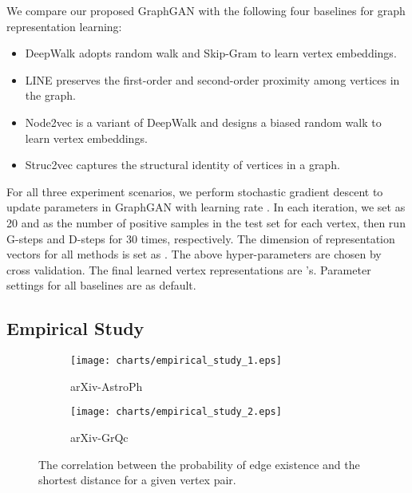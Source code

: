 \documentclass[letterpaper]{article}
\begin{document}
		We compare our proposed GraphGAN with the following four baselines for graph representation learning:
		\begin{itemize}
			\setlength\itemsep{0.0em}
			\item
				DeepWalk \cite{perozzi2014deepwalk} adopts random walk and Skip-Gram to learn vertex embeddings.
			\item
				LINE \cite{tang2015line} preserves the first-order and second-order proximity among vertices in the graph.
			\item
				Node2vec \cite{grover2016node2vec} is a variant of DeepWalk and designs a biased random walk to learn vertex embeddings.
			\item
				Struc2vec \cite{ribeiro2017struc2vec} captures the structural identity of vertices in a graph.
		\end{itemize}
		
		For all three experiment scenarios, we perform stochastic gradient descent to update parameters in GraphGAN with learning rate .
		In each iteration, we set  as 20 and  as the number of positive samples in the test set for each vertex, then run G-steps and D-steps for 30 times, respectively.
		The dimension of representation vectors  for all methods is set as .
		The above hyper-parameters are chosen by cross validation.
		The final learned vertex representations are 's.
		Parameter settings for all baselines are as default.
		
	
	\subsection{Empirical Study}
		\begin{figure}
			\centering
			\begin{subfigure}[b]{0.23\textwidth}
   				\texttt{[image: charts/empirical\_study\_1.eps]}
   				\caption{arXiv-AstroPh}
   				\label{fig:empirical_study_1}
			\end{subfigure}
			\hfill
			\begin{subfigure}[b]{0.23\textwidth}
				\texttt{[image: charts/empirical\_study\_2.eps]}
				\caption{arXiv-GrQc}
				\label{fig:empirical_study_2}
			\end{subfigure}
			\caption{The correlation between the probability of edge existence and the shortest distance for a given vertex pair.}			
			\label{fig:empirical_study}
		\end{figure}
		
\end{document}
